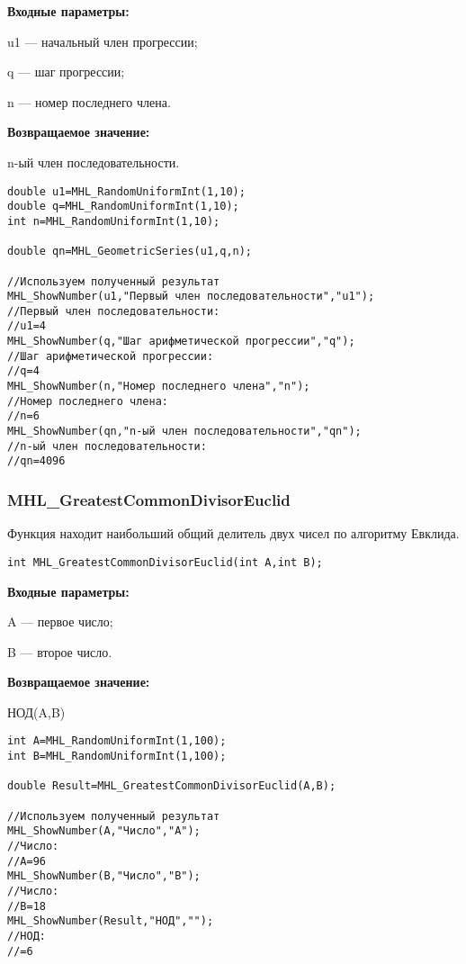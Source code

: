 \documentclass[a4paper,12pt]{article}
\begin{document}
\textbf{Входные параметры:}  
 
u1 --- начальный член прогрессии;
 
q --- шаг  прогрессии;
 
n --- номер последнего члена.

\textbf{Возвращаемое значение:}
 
n-ый член последовательности.


\begin{lstlisting}[label=code_use_MHL_GeometricSeries,caption=Пример использования]
double u1=MHL_RandomUniformInt(1,10);
double q=MHL_RandomUniformInt(1,10);
int n=MHL_RandomUniformInt(1,10);

double qn=MHL_GeometricSeries(u1,q,n);

//Используем полученный результат
MHL_ShowNumber(u1,"Первый член последовательности","u1");
//Первый член последовательности:
//u1=4
MHL_ShowNumber(q,"Шаг арифметической прогрессии","q");
//Шаг арифметической прогрессии:
//q=4
MHL_ShowNumber(n,"Номер последнего члена","n");
//Номер последнего члена:
//n=6
MHL_ShowNumber(qn,"n-ый член последовательности","qn");
//n-ый член последовательности:
//qn=4096
\end{lstlisting}

\subsubsection{MHL\_GreatestCommonDivisorEuclid}\label{MHL_GreatestCommonDivisorEuclid}

Функция находит наибольший общий делитель двух чисел по алгоритму Евклида.


\begin{lstlisting}[label=code_syntax_MHL_GreatestCommonDivisorEuclid,caption=Синтаксис]
int MHL_GreatestCommonDivisorEuclid(int A,int B);
\end{lstlisting}

\textbf{Входные параметры:}  
 
A --- первое число;
 
B --- второе число.

\textbf{Возвращаемое значение:}
 
НОД(A,B)


\begin{lstlisting}[label=code_use_MHL_GreatestCommonDivisorEuclid,caption=Пример использования]
int A=MHL_RandomUniformInt(1,100);
int B=MHL_RandomUniformInt(1,100);

double Result=MHL_GreatestCommonDivisorEuclid(A,B);

//Используем полученный результат
MHL_ShowNumber(A,"Число","A");
//Число:
//A=96
MHL_ShowNumber(B,"Число","B");
//Число:
//B=18
MHL_ShowNumber(Result,"НОД","");
//НОД:
//=6
\end{lstlisting}
\end{document}
